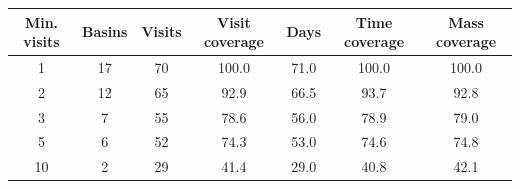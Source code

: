 \begin{tabular}{
  @{}S[table-format=2.0]
  S[table-format=2.0]
  S[table-format=2.0]
  S[table-format=3.1]
  S[table-format=2.1]
  S[table-format=3.1]
  S[table-format=3.1]@{}
}
\toprule
{Min. visits} & {Basins} & {Visits} & {Visit coverage} &
{Days} & {Time coverage} & {Mass coverage} \\
 & 17 & 70 & 100.0 & 71.0 & 100.0 & 100.0 \\
2 & 12 & 65 & 92.9 & 66.5 & 93.7 & 92.8 \\
3 & 7 & 55 & 78.6 & 56.0 & 78.9 & 79.0 \\
5 & 6 & 52 & 74.3 & 53.0 & 74.6 & 74.8 \\
10 & 2 & 29 & 41.4 & 29.0 & 40.8 & 42.1 \\
\bottomrule
\end{tabular}
